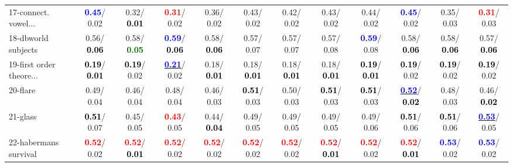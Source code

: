 \begin{table}[h]
\begin{center}
{\begin{tabular}{lc|c|c|c|c|c|c|c|c|c|c}
17-connect. vowel... & \textcolor{blue}{\textbf{  0.45}}/  0.02 &   0.32/\textcolor{black}{\textbf{  0.01}} & \textcolor{red}{\textbf{  0.31}}/  0.02 &   0.36/  0.02 &   0.43/  0.02 &   0.42/  0.02 &   0.43/  0.02 &   0.44/  0.02 & \textcolor{blue}{\textbf{  0.45}}/  0.02 &   0.35/  0.03 & \textcolor{red}{\textbf{  0.31}}/  0.03 \\
18-dbworld subjects &   0.56/\textcolor{black}{\textbf{  0.06}} &   0.58/\textcolor{darkgreen}{\textbf{  0.05}} & \textcolor{blue}{\textbf{  0.59}}/\textcolor{black}{\textbf{  0.06}} &   0.58/\textcolor{black}{\textbf{  0.06}} &   0.57/  0.07 &   0.57/  0.07 &   0.57/  0.08 & \textcolor{blue}{\textbf{  0.59}}/  0.08 &   0.58/\textcolor{black}{\textbf{  0.06}} &   0.58/\textcolor{black}{\textbf{  0.06}} &   0.57/\textcolor{black}{\textbf{  0.06}} \\
19-first order theore... & \textcolor{black}{\textbf{  0.19}}/\textcolor{black}{\textbf{  0.01}} & \textcolor{black}{\textbf{  0.19}}/  0.02 & \underline{\textcolor{blue}{\textbf{  0.21}}}/  0.02 &   0.18/\textcolor{black}{\textbf{  0.01}} &   0.18/\textcolor{black}{\textbf{  0.01}} &   0.18/\textcolor{black}{\textbf{  0.01}} &   0.18/\textcolor{black}{\textbf{  0.01}} & \textcolor{black}{\textbf{  0.19}}/\textcolor{black}{\textbf{  0.01}} & \textcolor{black}{\textbf{  0.19}}/  0.02 & \textcolor{black}{\textbf{  0.19}}/  0.02 & \textcolor{black}{\textbf{  0.19}}/  0.02 \\
20-flare &   0.49/  0.04 &   0.46/  0.04 &   0.48/  0.04 &   0.46/  0.03 & \textcolor{black}{\textbf{  0.51}}/  0.03 &   0.50/  0.03 & \textcolor{black}{\textbf{  0.51}}/  0.03 & \textcolor{black}{\textbf{  0.51}}/  0.03 & \underline{\textcolor{blue}{\textbf{  0.52}}}/\textcolor{black}{\textbf{  0.02}} &   0.48/  0.03 &   0.46/\textcolor{black}{\textbf{  0.02}} \\
21-glass & \textcolor{black}{\textbf{  0.51}}/  0.07 &   0.45/  0.05 & \textcolor{red}{\textbf{  0.43}}/  0.05 &   0.44/\textcolor{black}{\textbf{  0.04}} &   0.49/  0.05 &   0.49/  0.05 &   0.49/  0.05 &   0.49/  0.06 & \textcolor{black}{\textbf{  0.51}}/  0.06 & \textcolor{black}{\textbf{  0.51}}/  0.06 & \underline{\textcolor{blue}{\textbf{  0.53}}}/  0.05 \\ \hline
22-habermans survival & \textcolor{red}{\textbf{  0.52}}/  0.02 & \textcolor{red}{\textbf{  0.52}}/\textcolor{black}{\textbf{  0.01}} & \textcolor{red}{\textbf{  0.52}}/  0.02 & \textcolor{red}{\textbf{  0.52}}/  0.02 & \textcolor{red}{\textbf{  0.52}}/  0.02 & \textcolor{red}{\textbf{  0.52}}/  0.02 & \textcolor{red}{\textbf{  0.52}}/\textcolor{black}{\textbf{  0.01}} & \textcolor{red}{\textbf{  0.52}}/  0.02 & \textcolor{red}{\textbf{  0.52}}/\textcolor{black}{\textbf{  0.01}} & \textcolor{blue}{\textbf{  0.53}}/  0.02 & \textcolor{blue}{\textbf{  0.53}}/  0.02 \\

\end{tabular}}
\end{center}
\end{table}
